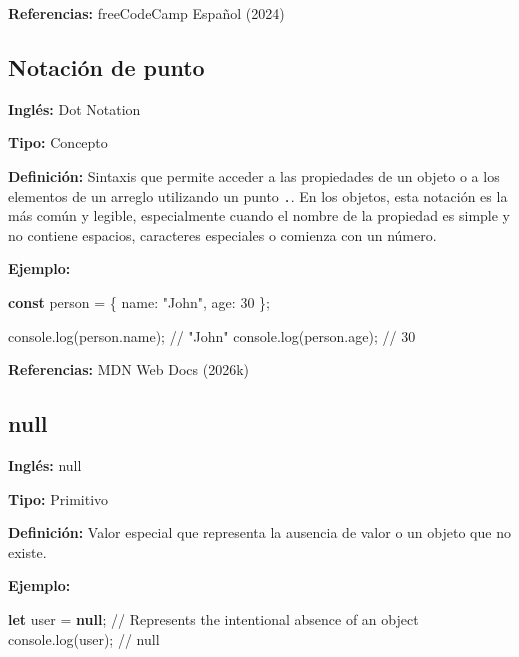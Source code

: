 \documentclass[
  letterpaper,
  DIV=11,
  numbers=noendperiod]{scrreprt}
\newenvironment{Shaded}{\begin{snugshade}}{\end{snugshade}}
\newcommand{\AttributeTok}[1]{\textcolor[rgb]{0.40,0.45,0.13}{#1}}
\newcommand{\BuiltInTok}[1]{\textcolor[rgb]{0.00,0.23,0.31}{#1}}
\newcommand{\CommentTok}[1]{\textcolor[rgb]{0.37,0.37,0.37}{#1}}
\newcommand{\DataTypeTok}[1]{\textcolor[rgb]{0.68,0.00,0.00}{#1}}
\newcommand{\DecValTok}[1]{\textcolor[rgb]{0.68,0.00,0.00}{#1}}
\newcommand{\FunctionTok}[1]{\textcolor[rgb]{0.28,0.35,0.67}{#1}}
\newcommand{\KeywordTok}[1]{\textcolor[rgb]{0.00,0.23,0.31}{\textbf{#1}}}
\newcommand{\NormalTok}[1]{\textcolor[rgb]{0.00,0.23,0.31}{#1}}
\newcommand{\OperatorTok}[1]{\textcolor[rgb]{0.37,0.37,0.37}{#1}}
\newcommand{\StringTok}[1]{\textcolor[rgb]{0.13,0.47,0.30}{#1}}
\let\oldsubsection\subsection
\renewcommand{\subsection}{\phantomsection\oldsubsection}
\begin{document}
\textbf{Referencias:} freeCodeCamp Español (2024)

\subsection*{Notación de punto}\label{glos-dot-notation}

\textbf{Inglés:} Dot Notation

\textbf{Tipo:} Concepto

\textbf{Definición:} Sintaxis que permite acceder a las propiedades de
un objeto o a los elementos de un arreglo utilizando un punto
\texttt{.}. En los objetos, esta notación es la más común y legible,
especialmente cuando el nombre de la propiedad es simple y no contiene
espacios, caracteres especiales o comienza con un número.

\textbf{Ejemplo:}

\begin{Shaded}
\begin{Highlighting}[]
\KeywordTok{const}\NormalTok{ person }\OperatorTok{=}\NormalTok{ \{}
  \DataTypeTok{name}\OperatorTok{:} \StringTok{"John"}\OperatorTok{,}
  \DataTypeTok{age}\OperatorTok{:} \DecValTok{30}
\NormalTok{\}}\OperatorTok{;}

\BuiltInTok{console}\OperatorTok{.}\FunctionTok{log}\NormalTok{(person}\OperatorTok{.}\AttributeTok{name}\NormalTok{)}\OperatorTok{;} \CommentTok{// "John"}
\BuiltInTok{console}\OperatorTok{.}\FunctionTok{log}\NormalTok{(person}\OperatorTok{.}\AttributeTok{age}\NormalTok{)}\OperatorTok{;} \CommentTok{// 30}
\end{Highlighting}
\end{Shaded}

\textbf{Referencias:} MDN Web Docs (2026k)

\subsection*{null}\label{glos-null}

\textbf{Inglés:} null

\textbf{Tipo:} Primitivo

\textbf{Definición:} Valor especial que representa la ausencia de valor
o un objeto que no existe.

\textbf{Ejemplo:}

\begin{Shaded}
\begin{Highlighting}[]
\KeywordTok{let}\NormalTok{ user }\OperatorTok{=} \KeywordTok{null}\OperatorTok{;} \CommentTok{// Represents the intentional absence of an object}
\BuiltInTok{console}\OperatorTok{.}\FunctionTok{log}\NormalTok{(user)}\OperatorTok{;} \CommentTok{// null}
\end{Highlighting}
\end{Shaded}
\end{document}
